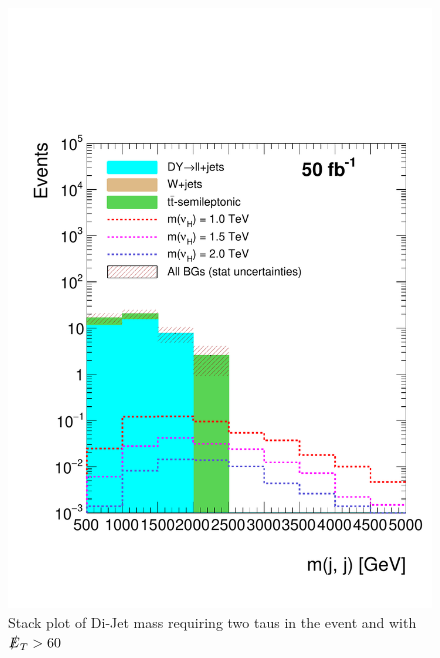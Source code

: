 \begin{figure}
\centering
\includegraphics[width=\linewidth]{StackPlots/mjj_2taus_met60_50ifb.pdf}
\caption{Stack plot of Di-Jet mass requiring two taus in the event and with $\slashed{E}_{T} > 60$}
\label{fig: mjj2tauMet60}
\end{figure}

